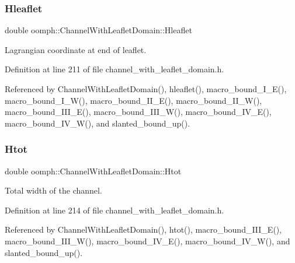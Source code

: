 \subsubsection{\texorpdfstring{Hleaflet}{Hleaflet}}
{\footnotesize\ttfamily double oomph\+::\+Channel\+With\+Leaflet\+Domain\+::\+Hleaflet\hspace{0.3cm}{\ttfamily [protected]}}



Lagrangian coordinate at end of leaflet. 



Definition at line 211 of file channel\+\_\+with\+\_\+leaflet\+\_\+domain.\+h.



Referenced by Channel\+With\+Leaflet\+Domain(), hleaflet(), macro\+\_\+bound\+\_\+\+I\+\_\+\+E(), macro\+\_\+bound\+\_\+\+I\+\_\+\+W(), macro\+\_\+bound\+\_\+\+I\+I\+\_\+\+E(), macro\+\_\+bound\+\_\+\+I\+I\+\_\+\+W(), macro\+\_\+bound\+\_\+\+I\+I\+I\+\_\+\+E(), macro\+\_\+bound\+\_\+\+I\+I\+I\+\_\+\+W(), macro\+\_\+bound\+\_\+\+I\+V\+\_\+\+E(), macro\+\_\+bound\+\_\+\+I\+V\+\_\+\+W(), and slanted\+\_\+bound\+\_\+up().

\mbox{\label{classoomph_1_1ChannelWithLeafletDomain_ad32b0daa71b42d34aec81c7e3d25cb98}} 
\subsubsection{\texorpdfstring{Htot}{Htot}}
{\footnotesize\ttfamily double oomph\+::\+Channel\+With\+Leaflet\+Domain\+::\+Htot\hspace{0.3cm}{\ttfamily [protected]}}



Total width of the channel. 



Definition at line 214 of file channel\+\_\+with\+\_\+leaflet\+\_\+domain.\+h.



Referenced by Channel\+With\+Leaflet\+Domain(), htot(), macro\+\_\+bound\+\_\+\+I\+I\+I\+\_\+\+E(), macro\+\_\+bound\+\_\+\+I\+I\+I\+\_\+\+W(), macro\+\_\+bound\+\_\+\+I\+V\+\_\+\+E(), macro\+\_\+bound\+\_\+\+I\+V\+\_\+\+W(), and slanted\+\_\+bound\+\_\+up().

